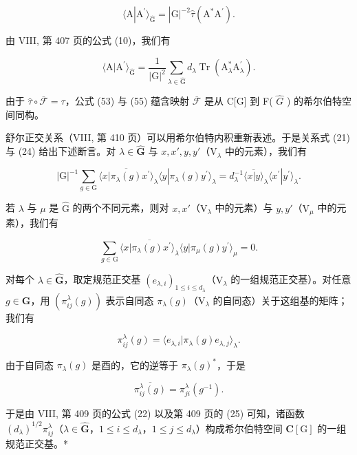 \[
\langle \mathrm{A} | \mathrm{A} ^ {\prime} \rangle_ {\widehat {\mathrm{G}}} = | \mathrm{G} | ^ {- 2} \widehat {\tau} (\mathrm{A} ^ {*} \mathrm{A} ^ {\prime}).\tag{55}
\]

由 VIII, 第 407 页的公式 (10)，我们有

\[
\langle \mathrm{A} | \mathrm{A} ^ {\prime} \rangle_ {\widehat {\mathrm{G}}} = \frac {1}{| \mathrm{G} | ^ {2}} \sum_ {\lambda \in \widehat {\mathrm{G}}} d _ {\lambda} \operatorname{Tr} (\mathrm{A} _ {\lambda} ^ {*} \mathrm{A} _ {\lambda} ^ {\prime}).\tag{56}
\]

由于 \(\hat{\tau}\circ\overline{{\mathcal{F}}}=\tau\)，公式 (53) 与 (55) 蕴含映射 \(\overline{{\mathcal{F}}}\) 是从 C{[}G{]} 到 F( \(\widehat{G}\) ) 的希尔伯特空间同构。

舒尔正交关系（VIII, 第 410 页）可以用希尔伯特内积重新表述。于是关系式 (21) 与 (24) 给出下述断言。对 \(\lambda \in \widehat{\mathbf{G}}\) 与 \(x, x', y, y'\)（\(\mathrm{V}_{\lambda}\) 中的元素），我们有

\[
| \mathrm{G} | ^ {- 1} \sum_ {g \in \mathrm{G}} \overline {{\langle x | \pi_ {\lambda} (g) x ^ {\prime} \rangle}} _ {\lambda} \langle y | \pi_ {\lambda} (g) y ^ {\prime} \rangle_ {\lambda} = d _ {\lambda} ^ {- 1} \overline {{\langle x | y \rangle}} _ {\lambda} \langle x ^ {\prime} | y ^ {\prime} \rangle_ {\lambda}.\tag{57}
\]

若 \(\lambda\) 与 \(\mu\) 是 \(\widehat{\mathrm{G}}\) 的两个不同元素，则对 \(x, x'\)（\(\mathrm{V}_{\lambda}\) 中的元素）与 \(y, y'\)（\(\mathrm{V}_{\mu}\) 中的元素），我们有

\[
\sum_ {g \in \mathrm{G}} \overline {{\langle x | \pi_ {\lambda} (g) x ^ {\prime} \rangle_ {\lambda}}} \langle y | \pi_ {\mu} (g) y ^ {\prime} \rangle_ {\mu} = 0.\tag{58}
\]

对每个 \(\lambda \in \widehat{\mathbf{G}}\)，取定规范正交基 \((e_{\lambda,i})_{1\leqslant i\leqslant d_{\lambda}}\)（\(\mathrm{V}_{\lambda}\) 的一组规范正交基）。对任意 \(g\in \mathbf{G}\)，用 \((\pi_{ij}^{\lambda}(g))\) 表示自同态 \(\pi_{\lambda}(g)\)（\(\mathrm{V}_{\lambda}\) 的自同态）关于这组基的矩阵；我们有

\[
\pi_ {i j} ^ {\lambda} (g) = \langle e _ {\lambda , i} | \pi_ {\lambda} (g) e _ {\lambda , j} \rangle_ {\lambda}.\tag{59}
\]

由于自同态 \(\pi_{\lambda}(g)\) 是酉的，它的逆等于 \(\pi_{\lambda}(g)^*\)，于是

\[
\overline {{\pi_ {i j} ^ {\lambda} (g)}} = \pi_ {j i} ^ {\lambda} (g ^ {- 1}).\tag{60}
\]

于是由 VIII, 第 409 页的公式 (22) 以及第 409 页的 (25) 可知，诸函数 \((d_{\lambda})^{1 / 2}\pi_{ij}^{\lambda}\)（\(\lambda \in \widehat{\mathbf{G}}\)，\(1\leqslant i\leqslant d_{\lambda}\)，\(1\leqslant j\leqslant d_{\lambda}\)）构成希尔伯特空间 \(\mathbf{C}[\mathrm{G}]\) 的一组规范正交基。*

